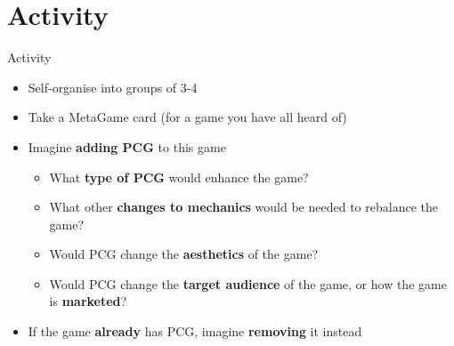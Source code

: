 \part{Activity}
\frame{\partpage}

\begin{frame}{Activity}
	\begin{itemize}
		\item Self-organise into groups of 3-4
		\item Take a MetaGame card (for a game you have all heard of)
		\item Imagine \textbf{adding PCG} to this game
			\begin{itemize}
				\item What \textbf{type of PCG} would enhance the game?
				\item What other \textbf{changes to mechanics} would be needed to rebalance the game?
				\item Would PCG change the \textbf{aesthetics} of the game?
				\item Would PCG change the \textbf{target audience} of the game, or how the game is \textbf{marketed}?
			\end{itemize}
		\item If the game \textbf{already} has PCG, imagine \textbf{removing} it instead
	\end{itemize}
\end{frame}
